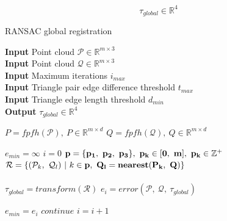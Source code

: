 \begin{equation}
    \tau_{global} \in \mathbb{R}^4
\end{equation}

\begin{algorithm}
    \caption{RANSAC global registration}\label{alg:ransac}
    \hspace*{\algorithmicindent} \textbf{Input} Point cloud \(\mathcal{P} \in \mathbb{R}^{m \times 3}\) \\
    \hspace*{\algorithmicindent} \textbf{Input} Point cloud \(\mathcal{Q} \in \mathbb{R}^{m \times 3}\) \\
    \hspace*{\algorithmicindent} \textbf{Input} Maximum iterations \(i_{max}\) \\
    \hspace*{\algorithmicindent} \textbf{Input} Triangle pair edge difference threshold \(t_{max}\) \\
    \hspace*{\algorithmicindent} \textbf{Input} Triangle edge length threshold \(d_{min}\) \\

    \hspace*{\algorithmicindent} \textbf{Output} \(\tau_{global} \in \mathbb{R}^4\) \\

    \begin{algorithmic}

    \State \(P = fpfh(\mathcal{P}),\ P \in \mathbb{R}^{m \times d}\)
    \State \(Q = fpfh(\mathcal{Q}),\ Q \in \mathbb{R}^{m \times d}\)

    \State $e_{min} = \infty$
    \State \(i = 0\)
        \State \(\bf{p} = \{p_1,\ p_2,\ p_3\},\ p_k \in [0,\ m],\ p_k \in \mathbb{Z}^+\) 
        \\
        \State \(\mathcal{R} = \{(\mathcal{P}_k,\ \mathcal{Q}_l)\ |\ k \in \bf{p},\ Q_l = nearest(P_k,\ Q)\}\) 
        \\
         
            \\
            \State $\tau_{global} = transform(\mathcal{R})$ 
            \State $e_i = error(\mathcal{P},\ \mathcal{Q},\ \tau_{global})$ 

             
                \State $e_{min} = e_i$
            \EndIf
        \Else
            \State $continue$
        \EndIf
        \State \(i = i + 1\)
    \EndWhile
    \end{algorithmic}
\end{algorithm}


